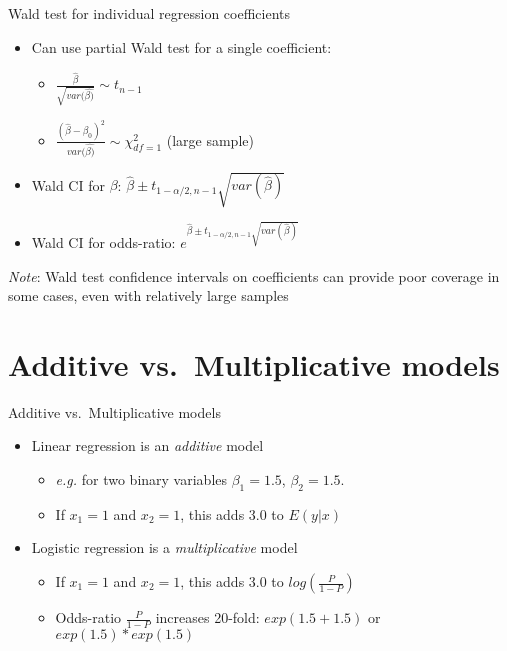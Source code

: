 \documentclass[
  ignorenonframetext,
]{beamer}
\providecommand{\tightlist}{%
  \setlength{\itemsep}{0pt}\setlength{\parskip}{0pt}}
\begin{document}
\begin{frame}{Wald test for individual regression coefficients}
\protect\hypertarget{wald-test-for-individual-regression-coefficients}{}

\begin{itemize}
\tightlist
\item
  Can use partial Wald test for a single coefficient:

  \begin{itemize}
  \tightlist
  \item
    \(\frac{\hat{\beta}}{\sqrt{var(\hat{\beta)}}} \sim t_{n-1}\)
  \item
    \(\frac{\left ( \hat{\beta} - \beta_0 \right )^2 }{var(\hat{\beta)}} \sim \chi^2_{df=1}\)
    (large sample)
  \end{itemize}
\item
  Wald CI for \(\beta\):
  \(\hat{\beta} \pm t_{1-\alpha/2, n-1} \sqrt{var(\hat{\beta})}\)
\item
  Wald CI for odds-ratio:
  \(e^{\hat{\beta} \pm t_{1-\alpha/2, n-1} \sqrt{var(\hat{\beta})}}\)
\end{itemize}

\emph{Note}: Wald test confidence intervals on coefficients can provide
poor coverage in some cases, even with relatively large samples

\end{frame}

\hypertarget{additive-vs.-multiplicative-models}{%
\section{Additive vs.~Multiplicative
models}\label{additive-vs.-multiplicative-models}}

\begin{frame}{Additive vs.~Multiplicative models}
\protect\hypertarget{additive-vs.-multiplicative-models-1}{}

\begin{itemize}
\tightlist
\item
  Linear regression is an \emph{additive} model

  \begin{itemize}
  \tightlist
  \item
    \emph{e.g.} for two binary variables \(\beta_1 = 1.5\),
    \(\beta_2 = 1.5\).
  \item
    If \(x_1=1\) and \(x_2=1\), this adds 3.0 to \(E(y|x)\)
  \end{itemize}
\item
  Logistic regression is a \emph{multiplicative} model

  \begin{itemize}
  \tightlist
  \item
    If \(x_1=1\) and \(x_2=1\), this adds 3.0 to \(log(\frac{P}{1-P})\)
  \item
    Odds-ratio \(\frac{P}{1-P}\) increases 20-fold: \(exp(1.5+1.5)\) or
    \(exp(1.5) * exp(1.5)\)
  \end{itemize}
\end{itemize}

\end{frame}
\end{document}

